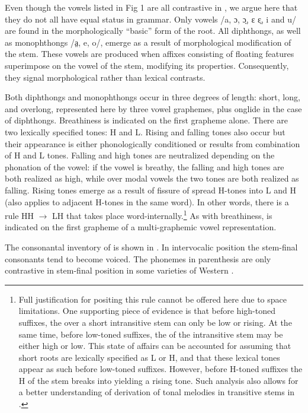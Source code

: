 \documentclass[output=paper,newtxmath,modfonts,nonflat]{langsci/langscibook}
\begin{document}
\pagebreak

Even though the vowels listed in Fig 1 are all contrastive in , we argue here that they do not all have equal status in  grammar. Only vowels /a, ɔ, ɔ̤, ɛ ɛ̤, i and u/ are found in the morphologically “basic” form of the root. All diphthongs, as well as monophthongs /a̤, e, o/, emerge as a result of morphological modification of the stem. These vowels are produced when affixes consisting of floating features superimpose on the vowel of the stem, modifying its properties. Consequently, they signal morphological rather than lexical contrasts.

Both diphthongs and monophthongs occur in three degrees of length: short, long, and overlong, represented here by three vowel graphemes, plus onglide in the case of diphthongs. Breathiness is indicated on the first grapheme alone. There are two lexically specified tones: H and L. Rising and falling tones also occur but their appearance is either phonologically conditioned or results from combination of H and L tones. Falling and high tones are neutralized depending on the phonation of the vowel: if the vowel is breathy, the falling and high tones are both realized as high, while over modal vowels the two tones are both realized as falling. Rising tones emerge as a result of fissure of spread H-tones into L and H (also applies to adjacent H-tones in the same word). In other words, there is a rule HH $\rightarrow$ LH that takes place word-internally.\footnote{Full justification for positing this rule cannot be offered here due to space limitations. One supporting piece of evidence is that before high-toned suffixes, the  over a short intransitive stem can only be low or rising. At the same time, before low-toned suffixes, the  of the intransitive stem may be either high or low. This state of affairs can be accounted for assuming that short roots are lexically specified as L or H, and that these lexical tones appear as such before low-toned suffixes. However, before H-toned suffixes the H of the stem breaks into yielding a rising tone. Such analysis also allows for a better understanding of derivation of tonal melodies in transitive stems in .} As with breathiness,  is indicated on the first grapheme of a multi-graphemic vowel representation.

The consonantal inventory of  is shown in . In intervocalic position the stem-final consonants tend to become voiced. The phonemes in parenthesis are only contrastive in stem-final position in some varieties of Western .
\end{document}
